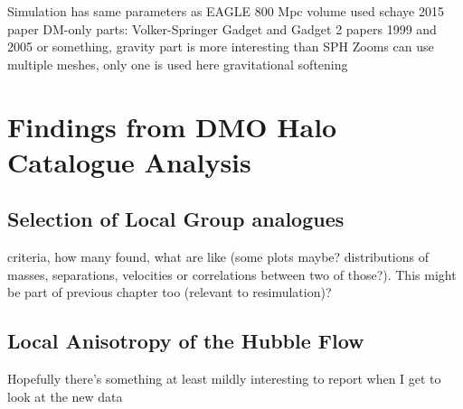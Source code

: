 \documentclass[english, oneside]{HYgradu}
\begin{document}
Simulation has same parameters as EAGLE
800 Mpc volume used
schaye 2015 paper
DM-only parts: Volker-Springer Gadget and Gadget 2 papers 1999 and 2005 or something,     gravity part is more interesting than SPH 
Zooms can use multiple meshes, only one is used here
gravitational softening

\chapter{Findings from DMO Halo Catalogue Analysis}
\section{Selection of Local Group analogues}
criteria, how many found, what are like (some plots maybe? distributions of masses, separations, velocities or correlations between two of those?). This might be part of previous chapter too (relevant to resimulation)?

\section{Local Anisotropy of the Hubble Flow}
Hopefully there's something at least mildly interesting to report when I get to look at the new data
\end{document}
